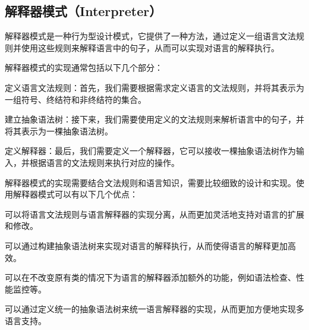 \subsection{解释器模式（Interpreter）}

解释器模式是一种行为型设计模式，它提供了一种方法，通过定义一组语言文法规则并使用这些规则来解释语言中的句子，从而可以实现对语言的解释执行。

解释器模式的实现通常包括以下几个部分：

定义语言文法规则：首先，我们需要根据需求定义语言的文法规则，并将其表示为一组符号、终结符和非终结符的集合。

建立抽象语法树：接下来，我们需要使用定义的文法规则来解析语言中的句子，并将其表示为一棵抽象语法树。

定义解释器：最后，我们需要定义一个解释器，它可以接收一棵抽象语法树作为输入，并根据语言的文法规则来执行对应的操作。

解释器模式的实现需要结合文法规则和语言知识，需要比较细致的设计和实现。使用解释器模式可以有以下几个优点：

可以将语言文法规则与语言解释器的实现分离，从而更加灵活地支持对语言的扩展和修改。

可以通过构建抽象语法树来实现对语言的解释执行，从而使得语言的解释更加高效。

可以在不改变原有类的情况下为语言的解释器添加额外的功能，例如语法检查、性能监控等。

可以通过定义统一的抽象语法树来统一语言解释器的实现，从而更加方便地实现多语言支持。


